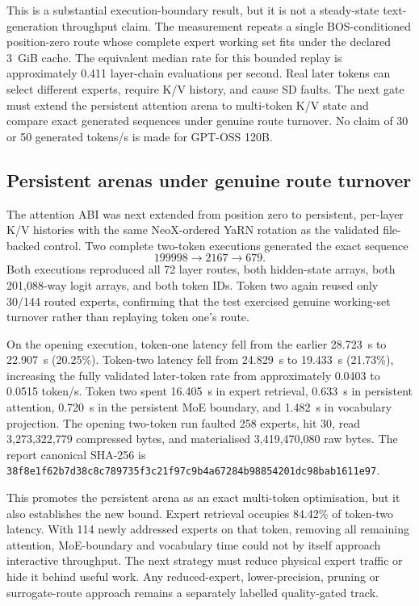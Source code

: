 This is a substantial execution-boundary result, but it is not a
steady-state text-generation throughput claim.  The measurement repeats a
single BOS-conditioned position-zero route whose complete expert working set
fits under the declared 3~GiB cache.  The equivalent median rate for this
bounded replay is approximately 0.411 layer-chain evaluations per second.
Real later tokens can select different experts, require K/V history, and cause
SD faults.  The next gate must extend the persistent attention arena to
multi-token K/V state and compare exact generated sequences under genuine route
turnover.  No claim of 30 or 50 generated tokens/s is made for GPT-OSS 120B.

\subsection{Persistent arenas under genuine route turnover}
The attention ABI was next extended from position zero to persistent,
per-layer K/V histories with the same NeoX-ordered YaRN rotation as the
validated file-backed control.  Two complete two-token executions generated
the exact sequence
\[
  199998 \longrightarrow 2167 \longrightarrow 679.
\]
Both executions reproduced all 72 layer routes, both hidden-state arrays, both
201,088-way logit arrays, and both token IDs.  Token two again reused only
30/144 routed experts, confirming that the test exercised genuine working-set
turnover rather than replaying token one's route.

On the opening execution, token-one latency fell from the earlier 28.723~s to
22.907~s (20.25\%).  Token-two latency fell from 24.829~s to 19.433~s
(21.73\%), increasing the fully validated later-token rate from approximately
0.0403 to 0.0515 token/s.  Token two spent 16.405~s in expert retrieval,
0.633~s in persistent attention, 0.720~s in the persistent MoE boundary, and
1.482~s in vocabulary projection.  The opening two-token run faulted 258
experts, hit 30, read 3,273,322,779 compressed bytes, and materialised
3,419,470,080 raw bytes.  The report canonical SHA-256 is
\texttt{38f8e1f62b7d38c8c789735f3c21f97c9b4a67284b98854201dc98bab1611e97}.

This promotes the persistent arena as an exact multi-token optimisation, but
it also establishes the new bound.  Expert retrieval occupies 84.42\% of
token-two latency.  With 114 newly addressed experts on that token, removing
all remaining attention, MoE-boundary and vocabulary time could not by itself
approach interactive throughput.  The next strategy must reduce physical
expert traffic or hide it behind useful work.  Any reduced-expert,
lower-precision, pruning or surrogate-route approach remains a separately
labelled quality-gated track.

